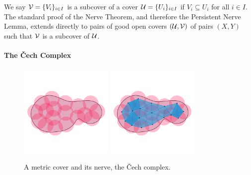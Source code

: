 We say $\mathcal{V} = \{V_i\}_{i\in I}$ is a subcover of a cover $\mathcal{U} = \{U_i\}_{i\in I}$ if $V_i\subseteq U_i$ for all $i\in I$.
The standard proof of the Nerve Theorem, and therefore the Persistent Nerve Lemma, extends directly to pairs of good open covers $(\mathcal{U}, \mathcal{V})$ of pairs $(X, Y)$ such that $\mathcal{V}$ is a subcover of $\mathcal{U}$.


\paragraph{The \v Cech Complex}

\begin{figure}[htbp]
  \centering
  \includegraphics[trim=0 300 0 500, clip, width=0.4\textwidth]{figures/cech/cover}
  \includegraphics[trim=0 300 0 500, clip, width=0.4\textwidth]{figures/cech/full}
  \caption{A metric cover and its nerve, the \v Cech complex.}\label{fig:nerves}
\end{figure}

